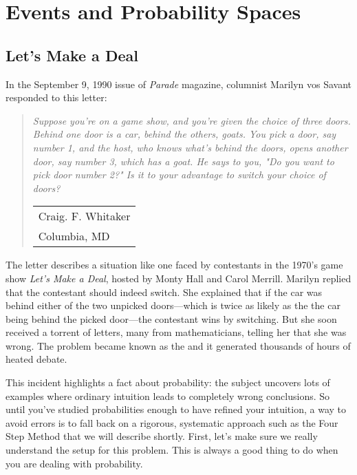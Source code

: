 \chapter{Events and Probability Spaces}\label{probability_chap}

\section{Let's Make a Deal}\label{monty_sec}

In the September 9, 1990 issue of \emph{Parade} magazine, columnist
Marilyn vos Savant responded to this letter:


\begin{quote}
\emph{Suppose you're on a game show, and you're given the
choice of three doors.  Behind one door is a car, behind the others,
goats.  You pick a door, say number 1, and the host, who knows what's
behind the doors, opens another door, say number 3, which has a goat.
He says to you, "Do you want to pick door number 2?"  Is it to your
advantage to switch your choice of doors?}
\begin{flushright}
\begin{tabular}{l}
Craig. F. Whitaker \\
Columbia, MD
\end{tabular}
\end{flushright}
\end{quote}

The letter describes a situation like one faced by contestants in the
1970's game show \emph{Let's Make a Deal}, hosted by Monty Hall and
Carol Merrill.  Marilyn replied that the contestant should indeed
switch.  She explained that if the car was behind either of the two
unpicked doors---which is twice as likely as the the car being behind
the picked door---the contestant wins by switching.  But she soon
received a torrent of letters, many from mathematicians, telling her
that she was wrong.  The problem became known as the  and it generated thousands of hours of heated debate.

This incident highlights a fact about probability: the subject uncovers
lots of examples where ordinary intuition leads to completely wrong
conclusions.  So until you've studied probabilities enough to have
refined your intuition, a way to avoid errors is to fall back on a
rigorous, systematic approach such as the Four Step Method that we
will describe shortly.  First, let's make sure we really understand
the setup for this problem.  This is always a good thing to do when
you are dealing with probability.

